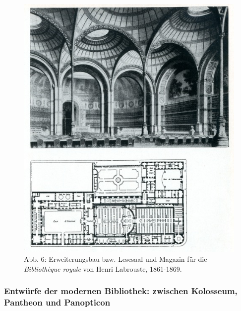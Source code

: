 \begin{figure}[htbp]
\centering
\includegraphics{img/wagner-6.jpg}
\caption*{Abb. 6: Erweiterungsbau bzw. Lesesaal und Magazin für die
\emph{Bibliothèque royale} von Henri Labrouste, 1861-1869.}
\end{figure}

\subsubsection{Entwürfe der modernen Bibliothek: zwischen Kolosseum,
Pantheon und
Panopticon}\label{entwuxfcrfe-der-modernen-bibliothek-zwischen-kolosseum-pantheon-und-panopticon}

